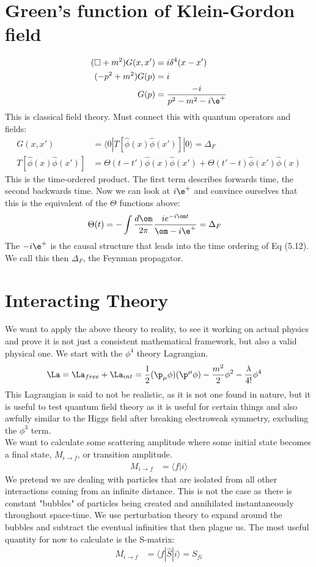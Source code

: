 \documentclass[a4paper, 11pt, normalem]{report}
\newcommand\hphi{\hat{\phi}}
\begin{document}
\section{Green's function of Klein-Gordon field}
\begin{align}
    (\Box + m^2)G(x,x') &= i\delta^4(x-x') \\
    (-p^2 + m^2)G(p) &= i \\
    G(p) &= \frac{-i}{p^2-m^2 - i\e^+}
\end{align}
This is classical field theory.
Must connect this with quantum operators and fields:
\begin{align}
    G(x,x') &= \langle0|T[\hphi(x)\hphi(x')]|0\rangle = \Delta_F \\
    T[\hphi(x)\hphi(x')] &= \Theta(t-t')\hphi(x)\hphi(x') + \Theta(t'-t)\hphi(x')\hphi(x)
\end{align}
This is the time-ordered product.
The first term describes forwards time, the second backwards time.
Now we can look at $i\e^+$ and convince ourselves that this is the equivalent of the $\Theta$ functions above:
\begin{align}
    \Theta(t) &= -\int \frac{d\om}{2\pi} \frac{ie^{-i\om t}}{\om - i\e^+} = \Delta_F
\end{align}
The $-i\e^+$ is the causal structure that leads into the time ordering of Eq (5.12).
We call this then $\Delta_F$, the Feynman propagator.

\section{Interacting Theory}
We want to apply the above theory to reality, to see it working on actual physics and prove it is not just a consistent mathematical framework, but also a valid physical one.
We start with the $\phi^4$ theory Lagrangian.
\begin{align}
    \La &= \La_{free} + \La_{int} = \frac12(\p_\mu\phi)(\p^\mu\phi) - \frac{m^2}{2}\phi^2 - \frac{\lambda}{4!}\phi^4
\end{align}
This Lagrangian is said to not be realistic, as it is not one found in nature, but it is useful to test quantum field theory as it is useful for certain things and also awfully similar to the Higgs field after breaking electroweak symmetry, excluding the $\phi^3$ term. \\
We want to calculate some scattering amplitude where some initial state becomes a final state, $M_{i\to f}$, or transition amplitude.
\begin{align}
    M_{i\to f} &= \langle f|i\rangle
\end{align}
We pretend we are dealing with particles that are isolated from all other interactions coming from an infinite distance.
This is not the case as there is constant "bubbles" of particles being created and annihilated instantaneously throughout space-time.
We use perturbation theory to expand around the bubbles and subtract the eventual infinities that then plague us.
The most useful quantity for now to calculate is the S-matrix:
\begin{align}
    M_{i\to f} &= \langle f|\hat{S}|i\rangle = S_{fi}
\end{align}
\end{document}
